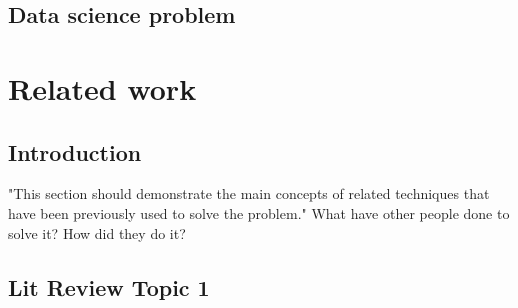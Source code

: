 \documentclass[12pt]{report}
\newcommand{\para}{\vspace{7pt}\noindent}
\begin{document}



\section{Data science problem}




\chapter{Related work}


\section{Introduction}
"This section should demonstrate the main concepts
of related techniques that have been previously used to solve the problem."
\para What have other people done to solve it? How did they do it? 


\section{Lit Review Topic 1}
\end{document}
